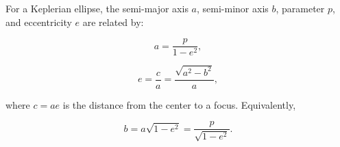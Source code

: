 For a Keplerian ellipse, the semi-major axis $a$, semi-minor axis $b$, parameter $p$, and eccentricity $e$ are related by:

$$a = \frac{p}{1 - e^2},$$

$$e = \frac{c}{a} = \frac{\sqrt{a^2 - b^2}}{a},$$

where $c = ae$ is the distance from the center to a focus. Equivalently,

$$b = a\sqrt{1 - e^2} = \frac{p}{\sqrt{1 - e^2}}.$$

